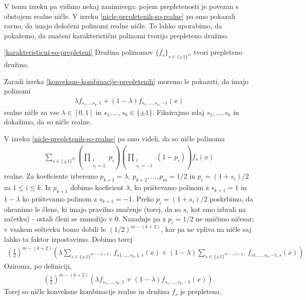 V temu izreku pa vidimo nekaj zanimivega: pojem prepletenosti je povezan s obstojem realne ničle. V izreku \ref{nicle-prepletenih-so-realne} pa smo pokazali ravno, da imajo določeni polinomi realne ničle. To lahko uporabimo, da pokažemo, da značeni karakteristični polinomi tvorijo prepleteno družino.

\begin{izrek}\ref{karakteristicni-so-prepleteni}
    Družina polinomov \(\{f_s\}_{s\in \{\pm 1\}^m}\) tvori prepleteno družino.
\end{izrek}
\begin{dokaz}
    Zaradi izreka \ref{konveksne-kombinacije-prepletenih} moremo le pokazati, da imajo polinomi
    \begin{align*}
        \lambda f_{s_1, \ldots s_k, 1} + (1-\lambda)f_{s_1,\ldots, s_k, -1}(x)
    \end{align*}
    realne ničle za vse \(\lambda\in [0,1]\) in \(s_1, \ldots, s_k\in \{\pm 1\}\). Fiksirajmo zdaj \(s_1, \ldots, s_k\) in dokažimo, da so ničle realne.

    V izreku \ref{nicle-prepletenih-so-realne} pa smo videli, da so ničle polinoma
    \begin{align*}
        \sum_{s\in \{\pm 1\}^m} \left(\prod_{\substack{i \\s_i=1}} p_{i}\right) \left(\prod_{\substack{i\\s_i=-1}} (1- p_{i})\right) f_s(x)
    \end{align*}
    realne. Za koeficiente izberemo \(p_{k+1}=\lambda\), \(p_{k+2},\ldots, p_m=1/2\) in \(p_i = (1+s_i)/2\) za \(1\leq i\leq k\). Iz \(p_{k+1}\) dobimo koeficient \(\lambda\), ko prištevamo polinom z \(s_{k+1}=1\) in \(1-\lambda\) ko prištevamo polinom z \(s_{k+1} = -1\). Preko \(p_i = (1+s_i)/2\) poskrbimo, da ohranimo le člene, ki imajo pravilno značenje (torej, da so \(s_i\) kot smo izbrali na začetku) - ostali členi se zmnožijo v \(0\). Nazadnje pa z \(p_i = 1/2\) ne uničimo ničesar; v vsakem seštevku bomo dobili le \((1/2)^{m-(k+2)}\), kar pa ne vpliva na ničle saj lahko ta faktor izpostavimo. Dobimo torej 
    \begin{align*}
        \left(\frac12\right)^{m-(k+2)}\left(\lambda \sum_{s\in \{\pm 1\}^{m-(k+2)}}f_{s1, \ldots, s_k, 1, s}(x) +(1-\lambda) \sum_{s\in \{\pm 1\}^{m-(k+2)}}f_{s1, \ldots, s_k, -1, s}(x)\right)
    \end{align*}
    Oziroma, po definiciji,
    \begin{align*}
        \left(\frac12\right)^{m-(k+2)}(\lambda f_{s_1, \ldots, s_k, 1} + (1-\lambda)f_{s_1,\ldots, s_k, -1}(x)).
    \end{align*}
    Torej so ničle konveksne kombinacije realne in družina \(f_s\) je prepletena.
\end{dokaz}

